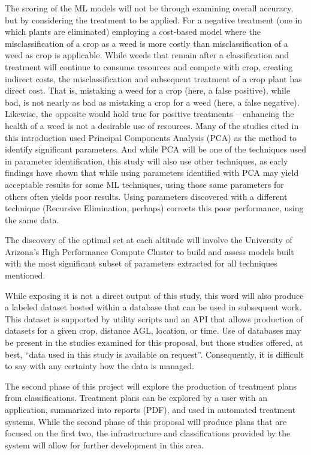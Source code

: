 \documentclass[12pt]{article}
\begin{document}
 The scoring of the ML models will not be through examining overall accuracy, but by considering the treatment to be applied.  For a negative treatment (one in which plants are eliminated) employing a cost-based model where the misclassification of a crop as a weed is more costly than misclassification of a weed as crop is applicable. While weeds that remain after a classification and treatment will continue to consume resources and compete with crop, creating indirect costs, the misclassification and subsequent treatment of a crop plant has direct cost. That is, mistaking a weed for a crop (here, a false positive), while bad, is not nearly as bad as mistaking a crop for a weed (here, a false negative). Likewise, the opposite would hold true for positive treatments -- enhancing the health of a weed is not a desirable use of resources.  Many of the studies cited in this introduction used Principal Components Analysis (PCA) as the method to identify significant parameters. And while PCA will be one of the techniques used in parameter identification, this study will also use other techniques, as early findings have shown that while using parameters identified with PCA may yield acceptable results for some ML techniques, using those same parameters for others often yields poor results. Using parameters discovered with a different technique (Recursive Elimination, perhaps) corrects this poor performance, using the same data.
 
 The discovery of the optimal set at each altitude will involve the University of Arizona's High Performance Compute Cluster to build and assess models built with the most significant subset of parameters extracted for all techniques mentioned.
 
While exposing it is not a direct output of this study, this word will also produce a labeled dataset hosted within a database that can be used in subsequent work. This dataset is supported by utility scripts and an API that allows production of datasets for a given crop, distance AGL, location, or time. Use of databases may be present in the studies examined for this proposal, but those studies offered, at best, ``data used in this study is available on request''. Consequently, it is difficult to say with any certainty how the data is managed. 
 
 The second phase of this project will explore the production of treatment plans from classifications. Treatment plans can be explored by a user with an application, summarized into reports (PDF), and used in automated treatment systems.  While the second phase of this proposal will  produce plans that are focused on the first two, the infrastructure and classifications provided by the system will allow for further development in this area.
\end{document}
